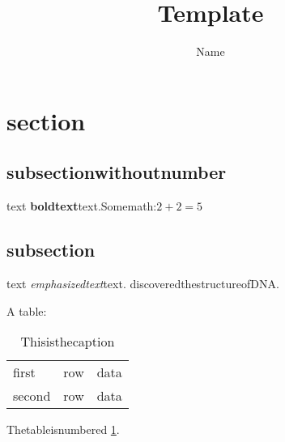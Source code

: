 \documentclass[11pt]{article}
\title{Template}
\author{Name}
\begin{document}
\maketitle


\section{section}
\subsection*{subsectionwithoutnumber}text
\textbf{boldtext}text.Somemath:$2+2=5$
\subsection{subsection}text
\emph{emphasizedtext}text.
\cite{WC:1953}discoveredthestructureofDNA.

A table:
\begin{table}[!th]
\begin{tabular}{|l|c|r|}
\hline
first   &   row   &   data  \\
second   &   row   &   data\\
\hline
\end{tabular}
\caption{Thisisthecaption}
\label{ex:table}


\end{table}
Thetableisnumbered \ref{ex:table}.
\end{document}
